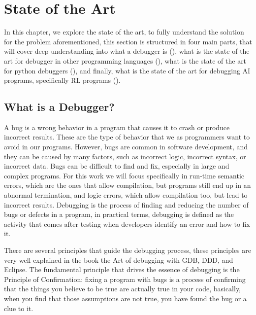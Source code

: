 
\chapter{State of the Art}
\label{cha:state_of_the_art}

In this chapter, we explore the state of the art, to fully understand the solution 
for the problem aforementioned, this section is structured in four main parts, that 
will cover deep understanding into what a debugger is (), what is the 
state of the art for debugger in other programming languages (), what 
is the state of the art for python debuggers (), and finally, what is the 
state of the art for debugging \ac{AI} programs, specifically \ac{RL} programs ().

\section{What is a Debugger?}
\label{sec:deb}
A bug is a wrong behavior in a program that causes it to crash or produce incorrect 
results. These are the type of behavior that we as programmers want to avoid in our
programs. However, bugs are common in software development, and they can be caused by 
many factors, such as incorrect logic, incorrect syntax, or incorrect data. Bugs can
be difficult to find and fix, especially in large and complex programs. For this work 
we will focus specifically in run-time semantic errors, which are the ones that allow 
compilation, but programs still end up in an abnormal termination, and logic 
errors, which allow compilation too, but lead to incorrect results. Debugging is the 
process of finding and reducing the number of 
bugs or defects in a program\cite{10.1007/978-3-642-32729-2_3}, in practical terms, 
debugging is defined as the activity that comes after testing when developers identify 
an error and how to fix it\cite{10.1080/08993400802114581}. 

There are several principles that guide the debugging process, these principles are 
very well explained in the book the Art of debugging with \ac{GDB}, \ac{DDD}, and Eclipse\cite{10.5555/1457534}.
The fundamental principle that drives the essence of debugging is the Principle of 
Confirmation: fixing a program with bugs is a process of confirming that the things you believe
to be true are actually true in your code\cite{10.5555/1457534}, basically, 
when you find that those assumptions are not true, you have found the bug or a clue to it.

